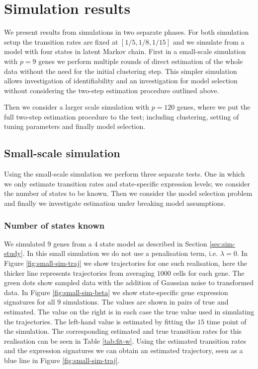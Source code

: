 \section{Simulation results}
\label{sec:results}

We present results from simulations in two separate phases. For both simulation setup the transition rates are fixed at $[1/5, 1/8, 1/15]$ and we simulate from a model with four states in latent Markov chain. First in a small-scale simulation with $p=9$ genes we perform multiple rounds of direct estimation of the whole data without the need for the initial clustering step. This simpler simulation allows investigation of identifiability and an investigation for model selection without considering the two-step estimation procedure outlined above.

Then we consider a larger scale simulation with $p=120$ genes, where we put the full two-step estimation procedure to the test; including clustering, setting of tuning parameters and finally model selection.



\subsection{Small-scale simulation}
\label{sec:small-scale-model}

Using the small-scale simulation we perform three separate  tests. One in which we only estimate transition rates and state-specific expression levels; we consider the number of states to be known. Then we consider the model selection problem and finally we investigate estimation under breaking model assumptions.

\subsubsection{Number of states known}
\label{sec:number-states-known}

We simulated $9$ genes from a $4$ state model as described in Section \ref{sec:sim-study}. In this small simulation we do not use a penalisation term, i.e. $\lambda=0$. In Figure \ref{fig:small-sim-traj} we show trajectories for one such realisation, here the thicker line represents trajectories from averaging $1000$ cells for each gene. The green dots show sampled data with the addition of Gaussian noise to transformed data. In Figure \ref{fig:small-sim-beta} we show state-specific gene expression signatures for all $9$ simulations. The values are shown in pairs of true and estimated. The value on the right is in each case the true value used in simulating the trajectories. The left-hand value is estimated by fitting the $15$ time point of the simulation. The corresponding estimated and true transition rates for this realisation can be seen in Table \ref{tab:fit-w}. Using the estimated transition rates and the expression signatures we can obtain an estimated trajectory, seen as a blue line in Figure \ref{fig:small-sim-traj}.

